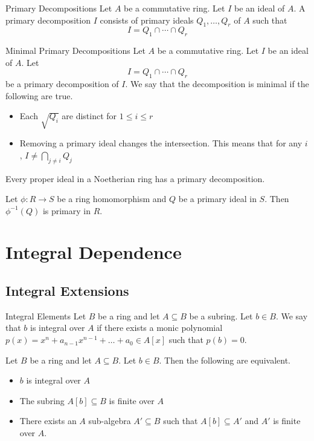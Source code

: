 \documentclass[a4paper]{article}
\begin{document}
\begin{defn}{Primary Decompositions}{} Let $A$ be a commutative ring. Let $I$ be an ideal of $A$. A primary decomposition $I$ consists of primary ideals $Q_1,\dots,Q_r$ of $A$ such that $$I=Q_1\cap\cdots\cap Q_r$$
\end{defn}

\begin{defn}{Minimal Primary Decompositions}{} Let $A$ be a commutative ring. Let $I$ be an ideal of $A$. Let $$I=Q_1\cap\cdots\cap Q_r$$ be a primary decomposition of $I$. We say that the decomposition is minimal if the following are true. 
\begin{itemize}
\item Each $\sqrt{Q_i}$ are distinct for $1\leq i\leq r$
\item Removing a primary ideal changes the intersection. This means that for any $i$, $I\neq\bigcap_{j\neq i}Q_j$
\end{itemize}
\end{defn}

\begin{thm}{}{} Every proper ideal in a Noetherian ring has a primary decomposition. 
\end{thm}

\begin{lmm}{}{} Let $\phi:R\to S$ be a ring homomorphism and $Q$ be a primary ideal in $S$. Then $\phi^{-1}(Q)$ is primary in $R$. 
\end{lmm}

\pagebreak
\section{Integral Dependence}
\subsection{Integral Extensions}
\begin{defn}{Integral Elements}{} Let $B$ be a ring and let $A\subseteq B$ be a subring. Let $b\in B$. We say that $b$ is integral over $A$ if there exists a monic polynomial $p(x)=x^n+a_{n-1}x^{n-1}+\dots+a_0\in A[x]$ such that $p(b)=0$. 
\end{defn}

\begin{prp}{}{} Let $B$ be a ring and let $A\subseteq B$. Let $b\in B$. Then the following are equivalent. 
\begin{itemize}
\item $b$ is integral over $A$
\item The subring $A[b]\subseteq B$ is finite over $A$
\item There exists an $A$ sub-algebra $A'\subseteq B$ such that $A[b]\subseteq A'$ and $A'$ is finite over $A$. 
\end{itemize}
\end{prp}
\end{document}
